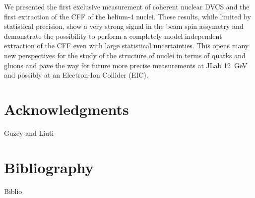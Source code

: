 \documentclass[%
 reprint,
 amsmath,amssymb,
 aps,
]{revtex4-1}
\begin{document}

We presented the first exclusive measurement of coherent nuclear DVCS and the
first extraction of the CFF of the helium-4 nuclei. These
results, while limited by statistical precision, show a very strong signal 
in the beam spin assymetry and demonstrate the possibility to perform a
completely model independent extraction of the CFF even with large 
statistical uncertainties. This opens many new perspectives 
for the study of the structure of nuclei in terms of quarks and gluons
and pave the way for future more precise measurements at JLab 12~GeV
and possibly at an Electron-Ion Collider (EIC).

\section*{Acknowledgments}
Guzey and Liuti

\section*{Bibliography}
Biblio
\end{document}
